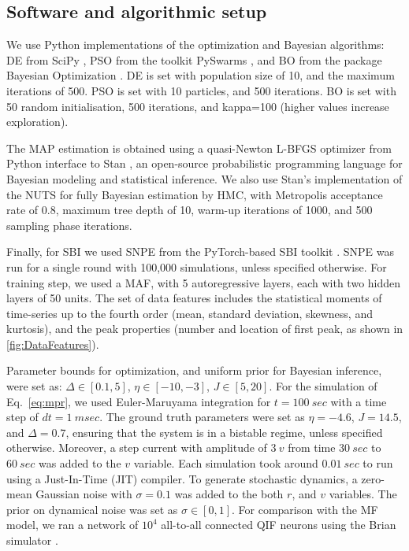 \documentclass[preprint,11pt,authoryear]{elsarticle}
\begin{document}
\subsection{Software and algorithmic setup} 

We use Python implementations of the optimization and Bayesian algorithms: DE from SciPy \citep{Virtanen2020scipy}, PSO from the toolkit PySwarms \citep{Miranda2018pyswarms}, and BO from the package Bayesian Optimization \citep{Nogueira2014BO}. DE is set with population size of 10, and the maximum iterations of 500. PSO is set with 10 particles, and 500 iterations. BO is set with 50 random initialisation, 500 iterations, and kappa=100 (higher values increase exploration).

The MAP estimation is obtained using a quasi-Newton L-BFGS optimizer from Python interface to Stan \citep{Carpenter2017}, an open-source probabilistic programming language for Bayesian modeling and statistical inference. We also use Stan's implementation of the NUTS for fully Bayesian estimation by HMC, with Metropolis acceptance rate of 0.8, maximum tree depth of 10, warm-up iterations of 1000, and 500 sampling phase iterations. 

Finally, for SBI we used SNPE from the PyTorch-based SBI toolkit \citep{Tejero2020sbi}. SNPE was run for a single round with 100,000 simulations, unless specified otherwise. For training step, we used a MAF, with 5 autoregressive layers, each with two hidden layers of 50 units.
The set of data features includes the statistical moments of time-series up to the fourth order (mean, standard deviation, skewness, and kurtosis), and the peak properties (number and location of first peak, as shown in \autoref{fig:DataFeatures}).


Parameter bounds for optimization, and  uniform prior for Bayesian inference, were set as: $\Delta \in [0.1, 5]$, $\eta \in [-10, -3]$, $J \in [5, 20]$. For the simulation of Eq.~\ref{eq:mpr}, we used Euler-Maruyama integration for $t=100~sec$ with a time step of $dt=1~msec$. The ground truth parameters were set as $\eta=-4.6$, $J=14.5$, and $\Delta=0.7$, ensuring that the system is in a bistable regime, unless specified otherwise. Moreover, a step current with amplitude of $3~v$ from time $30~sec$ to $60~sec$ was added to the $v$ variable. Each simulation took around $0.01~sec$ to run using a Just-In-Time (JIT) compiler.
To generate stochastic dynamics, a zero-mean Gaussian noise with $\sigma=0.1$ was added to the both $r$, and $v$ variables. The prior on dynamical noise was set as $\sigma \in [0, 1]$.
For comparison with the MF model, we ran a network of $10^4$ all-to-all connected QIF neurons using the Brian simulator \citep{Stimberg2019}.
 
\end{document}
